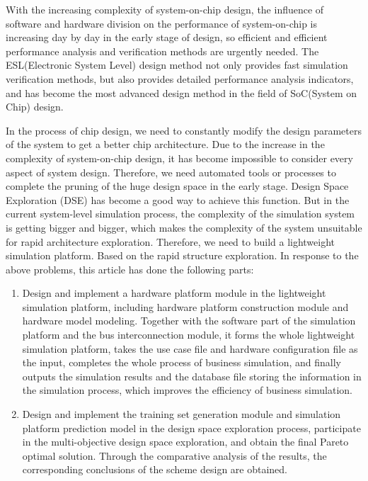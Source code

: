 \begin{abstract*}
  With the increasing complexity of system-on-chip design, the influence of software and hardware division on the performance of 
  system-on-chip is increasing day by day in the early stage of design, so efficient and efficient performance analysis and 
  verification methods are urgently needed. The ESL(Electronic System Level) design method not only provides fast simulation verification methods, but 
  also provides detailed performance analysis indicators, and has become the most advanced design method in the field of SoC(System on Chip) 
  design.

  In the process of chip design, we need to constantly modify the design parameters of the system to get a better chip architecture.
  Due to the increase in the complexity of system-on-chip design, it has become impossible to consider every aspect of system 
  design. Therefore, we need automated tools or processes to complete the pruning of the huge 
  design space in the early stage. Design Space Exploration (DSE) has become a good way to achieve this function. But in the 
  current system-level simulation process, the complexity of the simulation system is getting bigger and bigger, which makes 
  the complexity of the system unsuitable for rapid architecture exploration. Therefore, we need to build a lightweight simulation 
  platform. Based on the rapid structure exploration. In response to the above problems, this article has done the following parts:

  \begin{enumerate}
    \item Design and implement a hardware platform module in the lightweight simulation platform, including hardware platform construction module and hardware model modeling. Together with the software part of the simulation platform and the bus interconnection module, it forms the whole lightweight simulation platform, takes the use case file and hardware configuration file as the input, completes the whole process of business simulation, and finally outputs the simulation results and the database file storing the information in the simulation process, which improves the efficiency of business simulation.
    \item Design and implement the training set generation module and simulation platform prediction model in the design space exploration process, participate in the multi-objective design space exploration, and obtain the final Pareto optimal solution. Through the comparative analysis of the results, the corresponding conclusions of the scheme design are obtained.
  \end{enumerate}


\end{abstract*}
